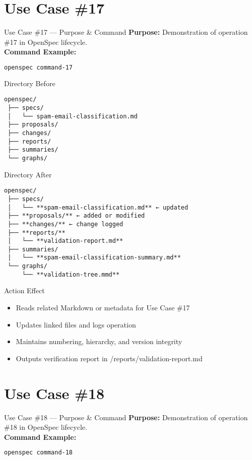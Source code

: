 \documentclass[aspectratio=169]{beamer}
\begin{document}
\section*{Use Case \#17}
\begin{frame}{Use Case \#17 --- Purpose \& Command}
\textbf{Purpose:} Demonstration of operation \#17 in OpenSpec lifecycle.\\[4pt]
\textbf{Command Example:}
\begin{lstlisting}[language=bash]
openspec command-17
\end{lstlisting}
\end{frame}

\begin{frame}{Directory Before}
\begin{lstlisting}
openspec/
 ├── specs/
 │   └── spam-email-classification.md
 ├── proposals/
 ├── changes/
 ├── reports/
 ├── summaries/
 └── graphs/
\end{lstlisting}
\end{frame}

\begin{frame}{Directory After}
\begin{lstlisting}
openspec/
 ├── specs/
 │   └── **spam-email-classification.md** ← updated
 ├── **proposals/** ← added or modified
 ├── **changes/** ← change logged
 ├── **reports/**
 │   └── **validation-report.md**
 ├── summaries/
 │   └── **spam-email-classification-summary.md**
 └── graphs/
     └── **validation-tree.mmd**
\end{lstlisting}
\end{frame}

\begin{frame}{Action Effect}
\begin{itemize}
  \item Reads related Markdown or metadata for Use Case \#17
  \item Updates linked files and logs operation
  \item Maintains numbering, hierarchy, and version integrity
  \item Outputs verification report in /reports/validation-report.md
\end{itemize}
\end{frame}

\section*{Use Case \#18}
\begin{frame}{Use Case \#18 --- Purpose \& Command}
\textbf{Purpose:} Demonstration of operation \#18 in OpenSpec lifecycle.\\[4pt]
\textbf{Command Example:}
\begin{lstlisting}[language=bash]
openspec command-18
\end{lstlisting}
\end{frame}
\end{document}
